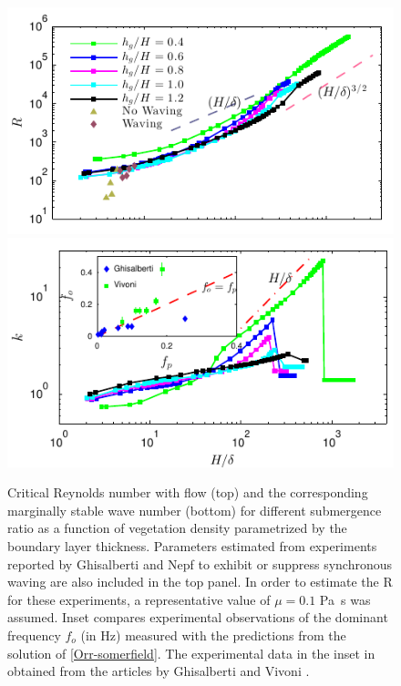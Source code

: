 \documentclass[aps,prl,reprint,twocolumn,showpacs,superscriptaddress,10pt]{revtex4-1}  %
\newcommand{\Rey}{\text{R}}
\begin{document}
\begin{figure}
\begin{center}
\includegraphics[]{Critical_Re_vs_delta_noshear} \\
\vspace{-6mm} \hspace{-3mm}
\includegraphics[]{K_vs_shear_width_noshear}
\end{center}
\caption{Critical Reynolds number with flow (top) and the corresponding marginally stable wave number (bottom) for different submergence ratio as a function of vegetation density
 parametrized by the boundary layer thickness. Parameters estimated from experiments reported by Ghisalberti and Nepf\cite{Ghisal02} to exhibit or suppress synchronous waving are 
also included in the top panel. In order to estimate the $\Rey$ for these experiments, a representative value of $\mu=0.1$ Pa~s was assumed. Inset compares experimental observations 
of the dominant frequency $f_o$ (in Hz) measured with the predictions from the solution of \eqref{Orr-somerfield}. The experimental data in the inset in obtained from the articles by 
Ghisalberti \cite{Ghisal02} and Vivoni \cite{Vivoni98}.}
\label{Re_vs_delta}
\end{figure}
\end{document}
